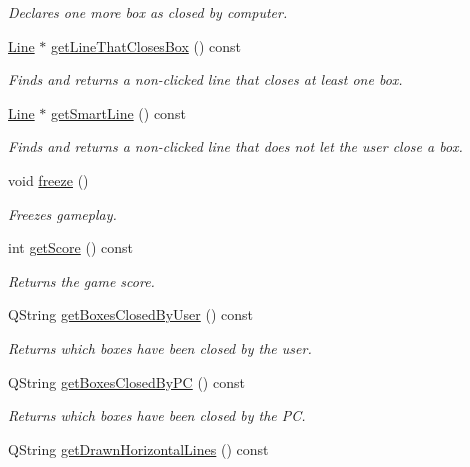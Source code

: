 \begin{DoxyCompactItemize}
\begin{DoxyCompactList}\small\item\em \-Declares one more box as closed by computer. \end{DoxyCompactList}\item 
\hyperlink{classLine}{\-Line} $\ast$ \hyperlink{classGame3Scene_a6f6707f6d26cec444e8f336c28c84959}{get\-Line\-That\-Closes\-Box} () const 
\begin{DoxyCompactList}\small\item\em \-Finds and returns a non-\/clicked line that closes at least one box. \end{DoxyCompactList}\item 
\hyperlink{classLine}{\-Line} $\ast$ \hyperlink{classGame3Scene_af15b82c1411cda7276c9ccb5644e5f6f}{get\-Smart\-Line} () const 
\begin{DoxyCompactList}\small\item\em \-Finds and returns a non-\/clicked line that does not let the user close a box. \end{DoxyCompactList}\item 
void \hyperlink{classGame3Scene_a00de2fe4e152c59fa638588301f5618c}{freeze} ()
\begin{DoxyCompactList}\small\item\em \-Freezes gameplay. \end{DoxyCompactList}\item 
int \hyperlink{classGame3Scene_a43a7e15210eb159a2dec71bf00db10c9}{get\-Score} () const 
\begin{DoxyCompactList}\small\item\em \-Returns the game score. \end{DoxyCompactList}\item 
\-Q\-String \hyperlink{classGame3Scene_a66330e50ed9312909949302292867c89}{get\-Boxes\-Closed\-By\-User} () const 
\begin{DoxyCompactList}\small\item\em \-Returns which boxes have been closed by the user. \end{DoxyCompactList}\item 
\-Q\-String \hyperlink{classGame3Scene_a16307e85274c2ccff7af7690550d005c}{get\-Boxes\-Closed\-By\-P\-C} () const 
\begin{DoxyCompactList}\small\item\em \-Returns which boxes have been closed by the \-P\-C. \end{DoxyCompactList}\item 
\-Q\-String \hyperlink{classGame3Scene_a175fc8ca97b32bd13997bb86119a5a69}{get\-Drawn\-Horizontal\-Lines} () const 

\end{DoxyCompactItemize}
